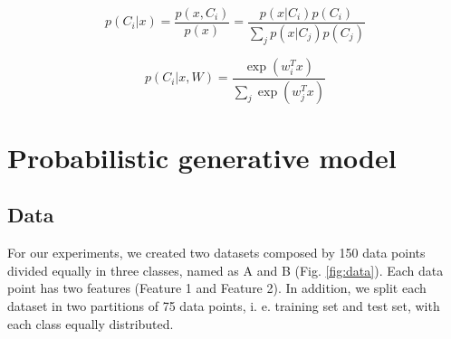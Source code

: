 \documentclass{article}
\begin{document}
\begin{equation}
  \label{eq1}
  p(C_{i}|x) = \dfrac{p(x,C_{i})}{p(x)} = \dfrac{p(x|C_{i})p(C_{i})}
  {\sum_{j} p(x|C_{j})p(C_{j})}
\end{equation}

\begin{equation}
  \label{eq2}
  p(C_{i}|x, W) = \dfrac{\exp(w_{i}^{T}x)}{\sum_{j} \exp(w_{j}^{T}x)}
\end{equation}

\section{Probabilistic generative model}

\subsection{Data}

For our experiments, we created two datasets composed by 150 data points divided equally in three classes, named as A and B (Fig. \ref{fig:data}). 
Each data point has two features (Feature 1 and Feature 2). In addition, we split each dataset in two partitions of 75 data points, i. e. training set and test set, with each class equally distributed.
\end{document}
